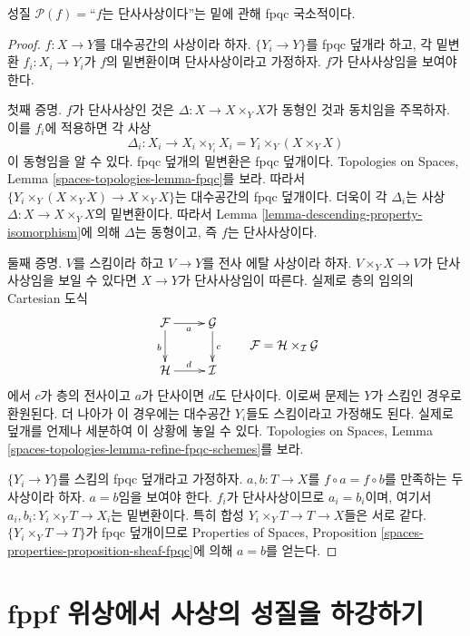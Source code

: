 \begin{lemma}
\label{lemma-descending-property-monomorphism}
성질 $\mathcal{P}(f)=$``$f$는 단사사상이다''는 밑에 관해 fpqc 국소적이다.
\end{lemma}

\begin{proof}
$f:X\to Y$를 대수공간의 사상이라 하자. $\{Y_i\to Y\}$를 fpqc 덮개라
하고, 각 밑변환 $f_i:X_i\to Y_i$가 $f$의 밑변환이며 단사사상이라고
가정하자.
$f$가 단사사상임을 보여야 한다.

\medskip\noindent
첫째 증명. $f$가 단사사상인 것은
$\Delta:X\to X\times_YX$가 동형인 것과 동치임을 주목하자. 이를
$f_i$에 적용하면 각 사상
$$
\Delta_i :
X_i
\longrightarrow
X_i \times_{Y_i} X_i = Y_i \times_Y (X \times_Y X)
$$
이 동형임을 알 수 있다. fpqc 덮개의 밑변환은 fpqc 덮개이다.
Topologies on Spaces, Lemma \ref{spaces-topologies-lemma-fpqc}를 보라.
따라서 $\{Y_i\times_Y(X\times_YX)\to X\times_YX\}$는 대수공간의
fpqc 덮개이다. 더욱이 각 $\Delta_i$는 사상
$\Delta:X\to X\times_YX$의 밑변환이다. 따라서 Lemma
\ref{lemma-descending-property-isomorphism}에 의해 $\Delta$는 동형이고,
즉 $f$는 단사사상이다.

\medskip\noindent
둘째 증명.
$V$를 스킴이라 하고 $V\to Y$를 전사 에탈 사상이라 하자.
$V\times_YX\to V$가 단사사상임을 보일 수 있다면 $X\to Y$가
단사사상임이 따른다. 실제로 층의 임의의 Cartesian 도식
$$
\vcenter{
\xymatrix{
\mathcal{F} \ar[r]_a \ar[d]_b & \mathcal{G} \ar[d]^c \\
\mathcal{H} \ar[r]^d & \mathcal{I}
}
}
\quad
\quad
\mathcal{F} = \mathcal{H} \times_\mathcal{I} \mathcal{G}
$$
에서 $c$가 층의 전사이고 $a$가 단사이면 $d$도 단사이다. 이로써 문제는
$Y$가 스킴인 경우로 환원된다. 더 나아가 이 경우에는 대수공간 $Y_i$들도
스킴이라고 가정해도 된다. 실제로 덮개를 언제나 세분하여 이 상황에
놓일 수 있다. Topologies on Spaces, Lemma
\ref{spaces-topologies-lemma-refine-fpqc-schemes}를 보라.

\medskip\noindent
$\{Y_i\to Y\}$를 스킴의 fpqc 덮개라고 가정하자. $a,b:T\to X$를
$f\circ a=f\circ b$를 만족하는 두 사상이라 하자. $a=b$임을 보여야
한다. $f_i$가 단사사상이므로 $a_i=b_i$이며, 여기서
$a_i,b_i:Y_i\times_YT\to X_i$는 밑변환이다. 특히 합성
$Y_i\times_YT\to T\to X$들은 서로 같다. $\{Y_i\times_YT\to T\}$가
fpqc 덮개이므로 Properties of Spaces, Proposition
\ref{spaces-properties-proposition-sheaf-fpqc}에 의해 $a=b$를 얻는다.
\end{proof}

\section{fppf 위상에서 사상의 성질을 하강하기}
\label{section-descending-properties-morphisms-fppf}

